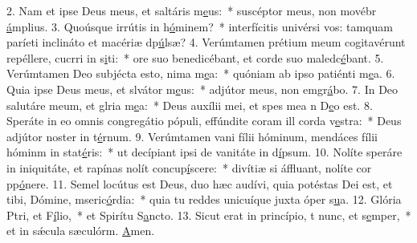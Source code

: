 2. Nam et ipse Deus meus, et saltáris m\uline{e}us:~* suscéptor meus, non movébr \uline{á}mplius.
3. Quoúsque irrútis in h\uline{ó}minem?~* interfícitis univérsi vos: tamquam paríeti inclináto et macériæ dp\uline{ú}lsæ?
4. Verúmtamen prétium meum cogitavérunt repéllere, cucrri in s\uline{i}ti:~* ore suo benedicébant, et corde suo maledc\uline{é}bant.
5. Verúmtamen Deo subjécta esto, nima m\uline{e}a:~* quóniam ab ipso patiénti m\uline{e}a.
6. Quia ipse Deus meus, et slvátor m\uline{e}us:~* adjútor meus, non emgr\uline{á}bo.
7. In Deo salutáre meum, et glria m\uline{e}a:~* Deus auxílii mei, et spes mea n D\uline{e}o est.
8. Speráte in eo omnis congregátio pópuli, effúndite coram ill corda v\uline{e}stra:~* Deus adjútor noster in t\uline{é}rnum.
9. Verúmtamen vani fílii hóminum, mendáces fílii hóminm in stat\uline{é}ris:~* ut decípiant ipsi de vanitáte in d\uline{í}psum.
10. Nolíte speráre in iniquitáte, et rapínas nolít concup\uline{í}scere:~* divítiæ si áffluant, nolíte cor pp\uline{ó}nere.
11. Semel locútus est Deus, duo hæc audívi, quia potéstas Dei est, et tibi, Dómine, mseric\uline{ó}rdia:~* quia tu reddes unicuíque juxta óper s\uline{u}a.
12. Glória Ptri, et F\uline{í}lio,~* et Spirítu S\uline{a}ncto.
13. Sicut erat in princípio, t nunc, et s\uline{e}mper,~* et in sǽcula sæculórm. \uline{A}men.
